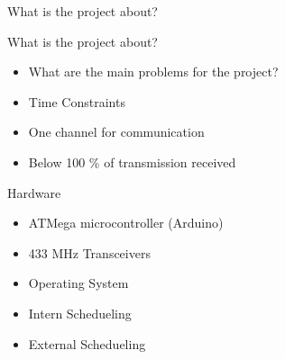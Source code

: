 \begin{frame}{What is the project about?}
	\begin{block}{What is the project about?}
	 	\begin{itemize}
			\item What are the main problems for the project?
			\item Time Constraints
			\item One channel for communication
			\item Below 100 \% of transmission received
		\end{itemize}
	\end{block}

	\begin{block}{Hardware}
		\begin{itemize}
			\item ATMega microcontroller (Arduino)
			\item 433 MHz Transceivers
			\item Operating System
			\item Intern Schedueling
			\item External Schedueling
		\end{itemize}
	\end{block}

\end{frame}